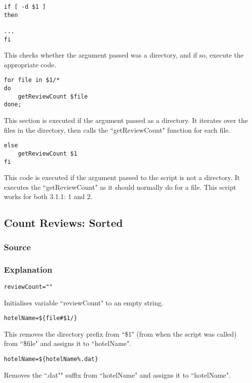 \documentclass[a4paper]{article}
\begin{document}
\begin{lstlisting}
if [ -d $1 ]
then

...
fi
\end{lstlisting}
This checks whether the argument passed was a directory, and if so, execute the appropriate code.

\begin{lstlisting}
for file in $1/*
do
	getReviewCount $file
done;
\end{lstlisting}
This section is executed if the argument passed as a directory.
It iterates over the files in the directory, then calls the ``getReviewCount" function for each file.

\begin{lstlisting}
else
	getReviewCount $1
fi
\end{lstlisting}
This code is executed if the argument passed to the script is not a directory.
It executes the ``getReviewCount" as it should normally do for a file. \newline \newline
This script works for both 3.1.1: 1 and 2.

%
\newpage
\subsection{Count Reviews: Sorted}
\subsubsection{Source}


\subsubsection{Explanation}
\begin{lstlisting}
reviewCount=""
\end{lstlisting}
Initialises variable ``reviewCount" to an empty string.

\begin{lstlisting}
hotelName=${file#$1/}
\end{lstlisting}
This removes the directory prefix from ``\$1" (from when the script was called) from ``\$file" and assigns it to ``hotelName".

\begin{lstlisting}
hotelName=${hotelName%.dat}
\end{lstlisting}
Removes the ``.dat"" suffix from ``hotelName" and assigns it to ``hotelName".
\end{document}

